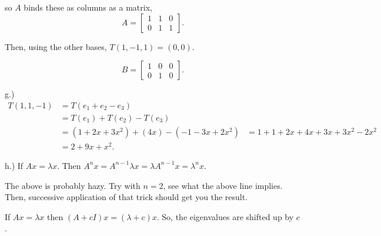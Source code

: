 \documentclass{article}
\begin{document}
so $A$ binds these as columns as a matrix, $$A = \left[ \begin{array}{ccc}

1 & 1 & 0\\
0 & 1 & 1
\end{array} \right].$$

Then, using the other bases, $T(1,-1,1) = (0,0)$. 

$$B = \left[ \begin{array}{ccc}

1 & 0 & 0\\
0 & 1 & 0
\end{array} \right].$$

g.) 
\begin{align*}
T(1,1,-1) &= T(e_1 + e_2 - e_3)\\
& = T(e_1)+ T(e_2)-T(e_3)\\
& = (1+2x+3x^2)+(4x)-(-1-3x+2x^2)
& = 1 + 1 + 2x + 4x + 3x + 3x^2 -2x^2\\
& = 2+9x +x^2.
\end{align*}

h.) If $Ax = \lambda x$. Then $A^n x = A^{n-1}\lambda x = \lambda A^{n-1}x=\lambda ^n x.$

The above is probably hazy. Try with $n=2$, see what the above line implies. Then, successive application of that trick should get you the result. 

If $Ax = \lambda x$ then $(A+cI)x = (\lambda + c)x$. So, the eigenvalues are shifted up by $c$ .
\end{document}
